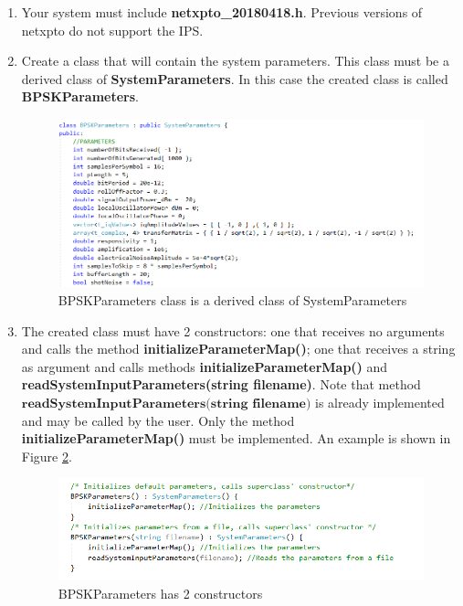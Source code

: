 \begin{enumerate}
\item Your system must include \textbf{netxpto\_20180418.h}. Previous versions of netxpto do not support the IPS.
\item Create a class that will contain the system parameters. This class must be a derived class of \textbf{SystemParameters}. In this case the created class is called \textbf{BPSKParameters}.

\renewcommand{\figurename}{Figure}
\begin{figure}[H]
\centering
\includegraphics[width=0.7\linewidth]{./chapter/simulator_structure/figures/bpsk_parameter_system}
\caption{BPSKParameters class is a derived class of SystemParameters}
\label{fig:ipsderivedclass}
\end{figure}

\item The created class must have 2 constructors: one that receives no arguments and calls the method \textbf{initializeParameterMap()}; one that receives a string as argument and calls methods \textbf{initializeParameterMap()} and \textbf{readSystemInputParameters(string filename)}. Note that method $\textbf{readSystemInputParameters(string filename)}$ is already implemented and may be called by the user. Only the method \textbf{initializeParameterMap()} must be implemented. An example is shown in Figure \ref{fig:ipsconstructors}.

\renewcommand{\figurename}{Figure}
\begin{figure}[H]
\centering
\includegraphics[width=0.7\linewidth]{./chapter/simulator_structure/figures/bpsk_parameters_constructor}
\caption{BPSKParameters has 2 constructors}
\label{fig:ipsconstructors}
\end{figure}


\end{enumerate}
